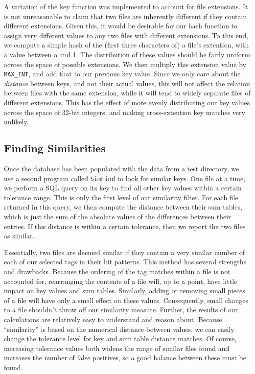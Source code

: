 \documentclass[10pt, twocolumn]{article}
\begin{document}
A variation of the key function was implemented to account for file extensions.  It is not unreasonable to claim that two files are inherently different if they contain different extensions.  Given this, it would be desirable for our hash function to assign very different values to any two files with different extensions.  To this end, we compute a simple hash of the (first three characters of) a file's extention, with a value between o and 1.  The distribution of these values should be fairly uniform across the space of possible extensions.  We then multiply this extension value by {\tt MAX\_INT}, and add that to our previous key value.  Since we only care about the {\it distance} between keys, and not their actual values, this will not affect the relation between files with the same extension, while it will tend to widely separate files of different extensions.  This has the effect of more evenly distributing our key values across the space of 32-bit integers, and making cross-extention key matches very unlikely.



\subsection{Finding Similarities}

Once the database has been populated with the data from a test directory, we use a second program called {\tt SimFind} to look for similar keys.  One file at a time, we perform a SQL query on its key to find all other key values within a certain tolerance range.  This is only the first level of our similarity filter.  For each file returned in this query, we then compute the distance between their sum tables, which is just the sum of the absolute values of the differences between their entries.  If this distance is within a certain tolerance, then we report the two files as similar.

Essentially, two files are deemed similar if they contain a very similar number of each of our selected tags in their bit patterns.  This method has several strengths and drawbacks.  Because the ordering of the tag matches within a file is not accounted for, rearranging the contents of a file will, up to a point, have little impact on key values and sum tables.  Similarly, adding or removing small pieces of a file will have only a small effect on these values.  Consequently, small changes to a file shouldn't throw off our similarity measure.  Further, the results of our calculations are relatively easy to understand and reason about.  Because ``similarity'' is based on the numerical distance between values, we can easily change the tolerance level for key and sum table distance matches.  Of course, increasing tolerance values both widens the range of similar files found and increases the number of false positives, so a good balance between these must be found.
\end{document}
